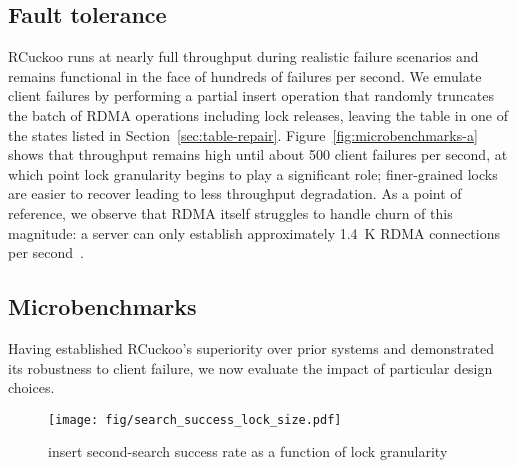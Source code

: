 \subsection{Fault tolerance}



RCuckoo runs at nearly full throughput during realistic
failure scenarios and remains functional in the face of
hundreds of failures per second.
We emulate client failures by
performing a partial insert operation that randomly truncates the
batch of RDMA operations including lock releases, leaving the table
in one of the  states listed in
Section~\ref{sec:table-repair}.
Figure~\ref{fig:microbenchmarks-a} shows that
throughput remains high until about 500 client failures per second, at
which point lock granularity begins to play a significant role;
finer-grained locks are easier to recover leading to less throughput
degradation.
As a point of reference, we observe that RDMA itself struggles to handle churn of this magnitude:
a server can only
establish approximately 1.4~K RDMA connections per second~\cite{xrdma}.

\subsection{Microbenchmarks}
\label{ss:mb}

Having established RCuckoo's superiority over prior systems and
demonstrated its robustness to client failure, we now evaluate the
impact of particular design choices.


\begin{figure}
\centering
        \texttt{[image: fig/search\_success\_lock\_size.pdf]}
\caption{insert second-search success rate as a function of lock granularity}
             \label{fig:microbenchmarks-c}
\end{figure}



